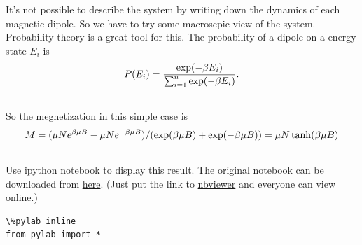 \documentclass[letterpaper,10pt,english]{sphinxmanual}
\begin{document}
It's not possible to describe the system by writing down the dynamics of each magnetic dipole. So we have to try some macroscpic view of the system. Probability theory is a great tool for this. The probability of a dipole on a energy state $E_i$ is
\begin{gather}
\begin{split}P(E_i) = \frac{\exp(-\beta E_i)}{\sum_{i=1}^{n} \exp(-\beta E_i)}  .\end{split}\notag\\\begin{split}\end{split}\notag
\end{gather}
So the megnetization in this simple case is
\begin{gather}
\begin{split}M = (\mu N e^{\beta \mu B} - \mu N e^{-\beta \mu B})/(\exp(\beta \mu B) + \exp(-\beta \mu B)) = \mu N \tanh (\beta \mu B)\end{split}\notag\\\begin{split}\end{split}\notag
\end{gather}
Use ipython notebook to display this result. The original notebook can be downloaded from \href{http://emptymalei.github.io/StatisticalPhysics/equilibrium/display.ipynb}{here}. (Just put the link to \href{http://nbviewer.ipython.org}{nbviewer} and everyone can view online.)
\begin{Verbatim}[commandchars=\\\{\}]
\%pylab inline
from pylab import *
\end{Verbatim}
\end{document}
